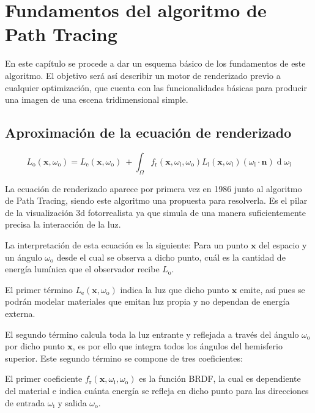 \chapter{Fundamentos del algoritmo de Path Tracing}
	

En este capítulo se procede a dar un esquema básico de los fundamentos de este algoritmo. El objetivo será así describir un motor de renderizado previo a cualquier optimización, que cuenta con las funcionalidades básicas para producir una imagen de una escena tridimensional simple.

	\section{Aproximación de la ecuación de renderizado}
\[
{\displaystyle L_{\text{o}}(\mathbf {x} ,\omega _{\text{o}})=L_{\text{e}}(\mathbf {x} ,\omega _{\text{o}})\ +\int _{\Omega }f_{\text{r}}(\mathbf {x} ,\omega _{\text{i}},\omega _{\text{o}})L_{\text{i}}(\mathbf {x} ,\omega _{\text{i}})(\omega _{\text{i}}\cdot \mathbf {n} )\operatorname {d} \omega _{\text{i}}}
\]

La ecuación de renderizado \cite{therenderingequation} aparece por primera vez en 1986 junto al algoritmo de Path Tracing, siendo este algoritmo una propuesta para resolverla. Es el pilar de la visualización 3d fotorrealista ya que simula de una manera suficientemente precisa la interacción de la luz.

La interpretación de esta ecuación es la siguiente: Para un punto $\mathbf {x}$ del espacio y un ángulo $\omega _{\text{o}}$ desde el cual se observa a dicho punto, cuál es la cantidad de energía lumínica que el observador recibe $L_{\text{o}}$.

El primer término $L_{\text{e}}(\mathbf {x} ,\omega _{\text{o}})$ indica la luz que dicho punto $\mathbf {x}$ emite, así pues se podrán modelar materiales que emitan luz propia y no dependan de energía externa.

El segundo término calcula toda la luz entrante y reflejada a través del ángulo $\omega _{\text{o}}$ por dicho punto $\mathbf {x}$, es por ello que integra todos los ángulos del hemisferio superior. Este segundo término se compone de tres coeficientes:

El primer coeficiente $f_{\text{r}}(\mathbf {x} ,\omega _{\text{i}},\omega _{\text{o}})$ es la función BRDF, la cual es dependiente del material e indica cuánta energía se refleja en dicho punto para las direcciones de entrada $\omega _{\text{i}}$ y salida $\omega _{\text{o}}$.

